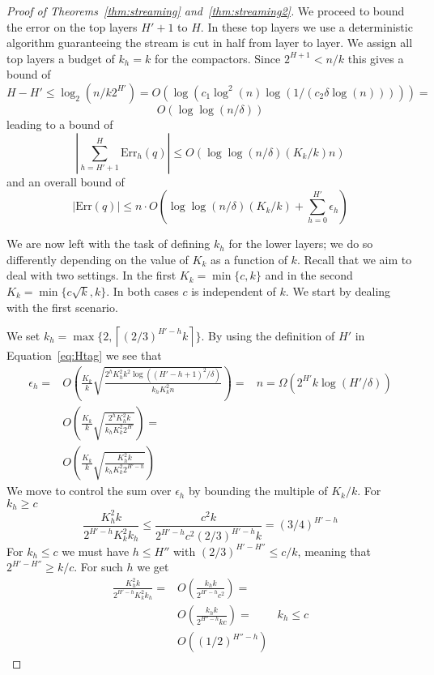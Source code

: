 \documentclass[anon,12pt]{colt2019} %
\newcommand{\eps}{\epsilon}
\newcommand{\ceil}[1]{\left \lceil #1 \right \rceil}
\newcommand{\komconstant}{c}
\begin{document}
\begin{proof} [Proof of Theorems~\ref{thm:streaming} and~\ref{thm:streaming2}]
We proceed to bound the error on the top layers $H'+1$ to $H$. In these top layers we use a deterministic algorithm guaranteeing the stream is cut in half from layer to layer. We assign all top layers a budget of $k_h=k$ for the compactors. Since $2^{H+1} < n/k$ this gives a bound of 
$$
H-H' \leq \log_2(n/k2^{H'}) = O\left( \log\left( c_1 \log^2(n) \log(1/(c_2 \delta \log(n))) \right)\right) = 
$$
$$
O\left( \log \log(n/\delta) \right)
$$
leading to a bound of 
$$ \left| \sum_{h=H'+1}^H \text{Err}_h(q) \right| \leq O\left( \log \log(n/\delta) (K_k/k) n \right) $$
and an overall bound of
\begin{equation} \label{eq:err total}
|\text{Err}(q)| \leq n \cdot O\left( \log \log(n/\delta)(K_k/k) + \sum_{h=0}^{H'} \eps_h \right)
\end{equation}

We are now left with the task of defining $k_h$ for the lower layers; we do so differently depending on the value of $K_k$ as a function of $k$. Recall that we aim to deal with two settings. In the first $K_k=\min\{\komconstant,k\}$ and in the second $K_k=\min\{\komconstant \sqrt{k}, k\}$. In both cases  $\komconstant$ is independent of $k$. We start by dealing with the first scenario.

We set $k_h = \max\{2, \ceil{(2/3)^{H'-h}k}\}$. By using the definition of $H'$ in Equation~\eqref{eq:Htag} we see that
\begin{align*}
\eps_h = & O\left( \frac{K_k}{k} \sqrt{\frac{2^h K_h^2 k^2 \log((H'-h+1)^2/\delta)}{k_h K_k^2 n}} \right) = & n=\Omega(2^{H'}k\log(H'/\delta)) \\
  	   &  O\left( \frac{K_k}{k} \sqrt{\frac{2^h K_h^2 k }{k_h K_k^2 2^{H'}}} \right) = \\
    	   &  O\left( \frac{K_k}{k} \sqrt{\frac{K_h^2 k }{k_h K_k^2 2^{H'-h}}} \right)
\end{align*}
We move to control the sum over $\eps_h$ by bounding the multiple of $K_k/k$. For $k_h \geq \komconstant$
$$
\frac{K_h^2 k}{2^{H'-h} K_k^2 k_{h}} \leq \frac{\komconstant^2 k}{2^{H'-h} \komconstant^2 (2/3)^{H'-h}k} =
(3/4)^{H'-h}
$$
For $k_h \leq \komconstant$ we must have $h \leq H''$ with $(2/3)^{H'-H''} \leq \komconstant/k$, meaning that $2^{H'-H''} \geq k/\komconstant$. For such $h$ we get
\begin{align*}
 \frac{K_h^2 k}{2^{H'-h} K_k^2 k_{h}} = &  O\left( \frac{ k_h k}{2^{H'-h} \komconstant^2 } \right) =  \\
    	   &  O\left( \frac{ k_h k}{2^{H''-h} k\komconstant } \right) = & k_h \leq \komconstant\\
	   &  O\left( (1/2)^{H''-h}   \right) 
\end{align*}


\end{proof}
\end{document}

